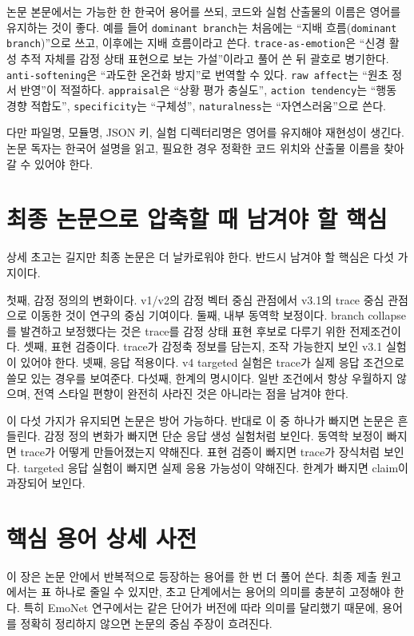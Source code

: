 \documentclass[11pt,a4paper]{article}
\newcommand{\eng}[1]{\texttt{#1}}
\begin{document}
논문 본문에서는 가능한 한 한국어 용어를 쓰되, 코드와 실험 산출물의 이름은 영어를 유지하는 것이 좋다. 예를 들어 \eng{dominant branch}는 처음에는 ``지배 흐름(\eng{dominant branch})''으로 쓰고, 이후에는 지배 흐름이라고 쓴다. \eng{trace-as-emotion}은 ``신경 활성 추적 자체를 감정 상태 표현으로 보는 가설''이라고 풀어 쓴 뒤 괄호로 병기한다. \eng{anti-softening}은 ``과도한 온건화 방지''로 번역할 수 있다. \eng{raw affect}는 ``원초 정서 반영''이 적절하다. \eng{appraisal}은 ``상황 평가 충실도'', \eng{action tendency}는 ``행동 경향 적합도'', \eng{specificity}는 ``구체성'', \eng{naturalness}는 ``자연스러움''으로 쓴다.

다만 파일명, 모듈명, JSON 키, 실험 디렉터리명은 영어를 유지해야 재현성이 생긴다. 논문 독자는 한국어 설명을 읽고, 필요한 경우 정확한 코드 위치와 산출물 이름을 찾아갈 수 있어야 한다.

\section{최종 논문으로 압축할 때 남겨야 할 핵심}

상세 초고는 길지만 최종 논문은 더 날카로워야 한다. 반드시 남겨야 할 핵심은 다섯 가지이다.

첫째, 감정 정의의 변화이다. v1/v2의 감정 벡터 중심 관점에서 v3.1의 trace 중심 관점으로 이동한 것이 연구의 중심 기여이다. 둘째, 내부 동역학 보정이다. branch collapse를 발견하고 보정했다는 것은 trace를 감정 상태 표현 후보로 다루기 위한 전제조건이다. 셋째, 표현 검증이다. trace가 감정축 정보를 담는지, 조작 가능한지 보인 v3.1 실험이 있어야 한다. 넷째, 응답 적용이다. v4 targeted 실험은 trace가 실제 응답 조건으로 쓸모 있는 경우를 보여준다. 다섯째, 한계의 명시이다. 일반 조건에서 항상 우월하지 않으며, 전역 스타일 편향이 완전히 사라진 것은 아니라는 점을 남겨야 한다.

이 다섯 가지가 유지되면 논문은 방어 가능하다. 반대로 이 중 하나가 빠지면 논문은 흔들린다. 감정 정의 변화가 빠지면 단순 응답 생성 실험처럼 보인다. 동역학 보정이 빠지면 trace가 어떻게 만들어졌는지 약해진다. 표현 검증이 빠지면 trace가 장식처럼 보인다. targeted 응답 실험이 빠지면 실제 응용 가능성이 약해진다. 한계가 빠지면 claim이 과장되어 보인다.

\section{핵심 용어 상세 사전}

이 장은 논문 안에서 반복적으로 등장하는 용어를 한 번 더 풀어 쓴다. 최종 제출 원고에서는 표 하나로 줄일 수 있지만, 초고 단계에서는 용어의 의미를 충분히 고정해야 한다. 특히 EmoNet 연구에서는 같은 단어가 버전에 따라 의미를 달리했기 때문에, 용어를 정확히 정리하지 않으면 논문의 중심 주장이 흐려진다.
\end{document}
